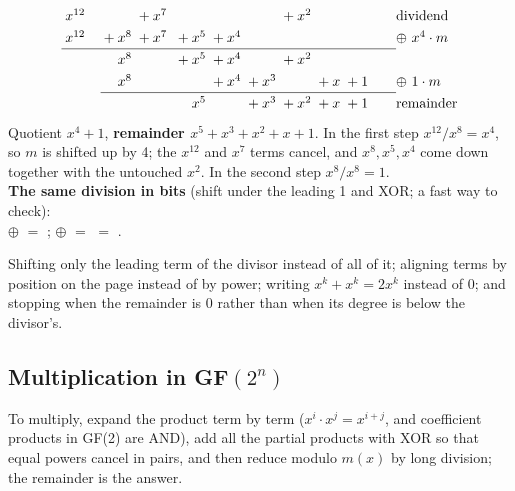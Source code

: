 \begin{worked}[: reduce $x^{12} + x^7 + x^2$ modulo $m(x) = x^8 + x^4 + x^3 + x + 1$ (Forouzan)]
\[
\renewcommand{\arraystretch}{1.3}\begin{array}{@{}*{13}{@{\;}r}@{\qquad}l@{}}
x^{12} &  &  &  &  & {}+x^{7} &  &  &  &  & {}+x^{2} &  &  & \text{dividend}\\
x^{12} &  &  &  & {}+x^{8} & {}+x^{7} &  & {}+x^{5} & {}+x^{4} &  &  &  &  & \oplus\ x^{4}\cdot m\\
\cline{1-13}
 &  &  &  & x^{8} &  &  & {}+x^{5} & {}+x^{4} &  & {}+x^{2} &  &  & \\
 &  &  &  & x^{8} &  &  &  & {}+x^{4} & {}+x^{3} &  & {}+x & {}+1 & \oplus\ 1\cdot m\\
\cline{5-13}
 &  &  &  &  &  &  & x^{5} &  & {}+x^{3} & {}+x^{2} & {}+x & {}+1  & \text{remainder}\\
\end{array}
\]
Quotient $x^4 + 1$, \textbf{remainder $x^5 + x^3 + x^2 + x + 1$}. In the first step $x^{12} / x^8 = x^4$, so $m$ is shifted up by 4; the $x^{12}$ and $x^7$ terms cancel, and $x^8, x^5, x^4$ come down together with the untouched $x^2$. In the second step $x^8 / x^8 = 1$.\\[2pt]
\textbf{The same division in bits} (shift  under the leading 1 and XOR; a fast way to check):\\
 $\oplus$  $=$ ; \quad {} $\oplus$  $=$  $=$ .
\end{worked}

\begin{trap}
Shifting only the leading term of the divisor instead of all of it; aligning terms by position on the page instead of by power; writing $x^k + x^k = 2x^k$ instead of 0; and stopping when the remainder is 0 rather than when its degree is below the divisor's.
\end{trap}

\subsection{Multiplication in GF$(2^n)$ \hot}
To multiply, expand the product term by term ($x^i \cdot x^j = x^{i+j}$, and coefficient products in GF(2) are AND), add all the partial products with XOR so that equal powers cancel in pairs, and then reduce modulo $m(x)$ by long division; the remainder is the answer.

